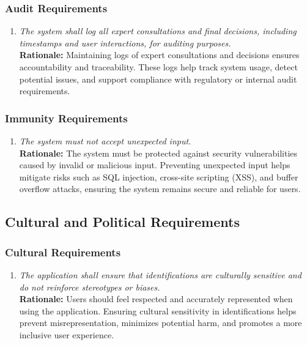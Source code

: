 \documentclass[]{article}
\begin{document}
\subsubsection{Audit Requirements}
\label{ssub:audit_requirements}
\begin{enumerate}[{SR-AU}1. ]
	\item \textit{The system shall log all expert consultations and final decisions, including timestamps and user interactions, for auditing purposes.}
	\\ \textbf{Rationale:} Maintaining logs of expert consultations and decisions ensures accountability and traceability. These logs help track system usage, detect potential issues, and support compliance with regulatory or internal audit requirements.
\end{enumerate}

\subsubsection{Immunity Requirements}
\label{ssub:immunity_requirements}
\begin{enumerate}[{SR-IM}1. ]
	\item \textit{The system must not accept unexpected input.}
	\\ \textbf{Rationale:} The system must be protected against security vulnerabilities caused by invalid or malicious input. Preventing unexpected input helps mitigate risks such as SQL injection, cross-site scripting (XSS), and buffer overflow attacks, ensuring the system remains secure and reliable for users.
\end{enumerate}


\subsection{Cultural and Political Requirements}
\label{sub:cultural_and_political_requirements}

\subsubsection{Cultural Requirements}
\label{ssub:cultural_requirements}
\begin{enumerate}[{CP-C}1. ]
	\item \textit{The application shall ensure that identifications are culturally sensitive and do not reinforce stereotypes or biases.}
	\\ \textbf{Rationale:} Users should feel respected and accurately represented when using the application. Ensuring cultural sensitivity in identifications helps prevent misrepresentation, minimizes potential harm, and promotes a more inclusive user experience.
\end{enumerate}
\end{document}
